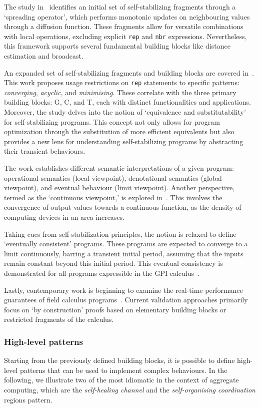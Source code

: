 The study in~\cite{damiani2015type}
 identifies an initial set of self-stabilizing fragments through a `spreading operator', 
 which performs monotonic updates on neighbouring values through a diffusion function. 
 These fragments allow for versatile combinations with local operations, 
 excluding explicit \texttt{rep} and \texttt{nbr} expressions. 
 Nevertheless, this framework supports several fundamental building blocks like distance estimation and broadcast.

An expanded set of self-stabilizing fragments and building blocks are covered in~\cite{viroli2018engineering}. 
 This work proposes usage restrictions on \texttt{rep} statements to specific patterns: 
 \emph{converging}, \emph{acyclic}, and \emph{minimising}. 
 These correlate with the three primary building blocks: 
 G, C, and T, each with distinct functionalities and applications. 
 Moreover, the study delves into the notion of `equivalence and substitutability' for self-stabilizing programs. 
 This concept not only allows for program optimization through the substitution of more efficient equivalents but also provides a new lens for understanding self-stabilizing programs by abstracting their transient behaviours.

The work establishes different semantic interpretations of a given program: 
 operational semantics (local viewpoint), denotational semantics (global viewpoint), and eventual behaviour (limit viewpoint). 
 Another perspective, termed as the `continuous viewpoint,' is explored in~\cite{beal2017self}. 
 This involves the convergence of output values towards a continuous function, 
 as the density of computing devices in an area increases.

Taking cues from self-stabilization principles, 
 the notion is relaxed to define `eventually consistent' programs. 
 These programs are expected to converge to a limit continuously, 
 barring a transient initial period, assuming that the inputs remain constant beyond this initial period. This eventual consistency is demonstrated for all programs expressible in the GPI calculus~\cite{audrito2018space}.

Lastly, 
 contemporary work is beginning to examine the real-time performance guarantees of field calculus programs~\cite{audrito2018space}. 
 Current validation approaches primarily focus on `by construction' proofs based on elementary building blocks or restricted fragments of the calculus. 
\subsubsection{High-level patterns}\label{sec:field-calculus-high-level-patterns}
Starting from the previously defined building blocks, 
 it is possible to define high-level patterns that can be used to implement complex behaviours.
 In the following, we illustrate two of the most idiomatic in the context of aggregate computing, which are 
 the \emph{self-healing channel} and the \emph{self-organising coordination} regions pattern.
